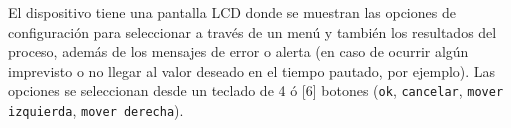 

El dispositivo tiene una pantalla LCD donde se muestran las opciones de configuración para seleccionar a través de un menú y también los resultados del proceso, además de los mensajes de error o alerta (en caso de ocurrir algún imprevisto o no llegar al valor deseado en el tiempo pautado, por ejemplo). Las opciones se seleccionan desde un teclado de 4 ó [6] botones (\texttt{ok}, \texttt{cancelar}, \texttt{mover izquierda}, \texttt{mover derecha}).

